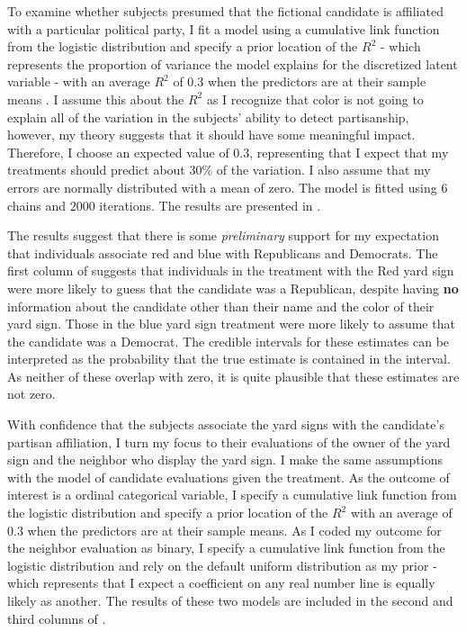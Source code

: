 \documentclass [12pt]{article}
\begin{document}
To examine whether subjects presumed that the fictional candidate is affiliated with a particular political party, I fit a model using a cumulative link function from the logistic distribution and specify a prior location of the $R^2$ - which represents the proportion of variance the model explains for the discretized latent variable - with an average $R^2$ of $0.3$ when the predictors are at their sample means \citep[see][Chapter 15]{gelman_et-al_2021}. I assume this about the $R^2$ as I recognize that color is not going to explain all of the variation in the subjects' ability to detect partisanship, however, my theory suggests that it should have some meaningful impact. Therefore, I choose an expected value of $0.3$, representing that I expect that my treatments should predict about $30\%$ of the variation. I also assume that my errors are normally distributed with a mean of zero. The model is fitted using $6$ chains and $2000$ iterations. The results are presented in .




The results suggest that there is some \textit{preliminary} support for my expectation that individuals associate red and blue with Republicans and Democrats. The first column of  suggests that individuals in the treatment with the Red yard sign were more likely to guess that the candidate was a Republican, despite having \textbf{no} information about the candidate other than their name and the color of their yard sign. Those in the blue yard sign treatment were more likely to assume that the candidate was a Democrat. The credible intervals for these estimates can be interpreted as the probability that the true estimate is contained in the interval. As neither of these overlap with zero, it is quite plausible that these estimates are not zero.

With confidence that the subjects associate the yard signs with the candidate's partisan affiliation, I turn my focus to their evaluations of the owner of the yard sign and the neighbor who display the yard sign. I make the same assumptions with the model of candidate evaluations given the treatment. As the outcome of interest is a ordinal categorical variable, I specify a cumulative link function from the logistic distribution and specify a prior location of the $R^2$ with an average of $0.3$ when the predictors are at their sample means. As I coded my outcome for the neighbor evaluation as binary, I specify a cumulative link function from the logistic distribution and rely on the default uniform distribution as my prior - which represents that I expect a coefficient on any real number line is equally likely as another. The results of these two models are included in the second and third columns of .
\end{document}
